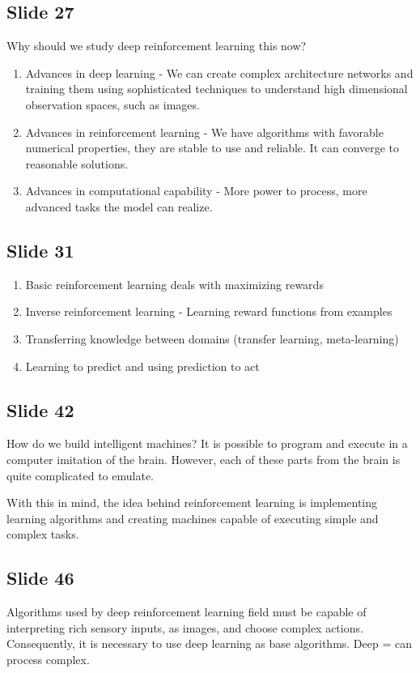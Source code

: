 \documentclass{article}
\begin{document}
\subsection*{Slide 27}
\par Why should we study deep reinforcement learning this now?
\begin{enumerate}
    \item  Advances in deep learning - We can create complex architecture networks and training them using
        sophisticated techniques to understand  high dimensional observation spaces, such as images.
    \item  Advances in reinforcement learning - We have algorithms with favorable numerical properties, they are
        stable to use and reliable. It can converge to reasonable solutions.
    \item Advances in computational capability - More power to process, more advanced tasks the model can realize.
\end{enumerate}

\subsection*{Slide 31}%
\label{sub:Slide 31}

\par 
\begin{enumerate}
    \item Basic reinforcement learning deals with maximizing rewards
    \item Inverse reinforcement learning - Learning reward functions from examples
    \item Transferring knowledge between domains (transfer learning, meta-learning)
    \item Learning to predict and using prediction to act
\end{enumerate}

\subsection*{Slide 42}%
\label{sub:Slide 42}
\par How do we build intelligent machines? It is possible to program and execute in a computer imitation of the brain.  However, each of these parts from the brain is quite complicated to emulate.

\par With this in mind, the idea behind reinforcement learning is implementing learning algorithms and creating machines 
capable of executing simple and complex tasks.


\subsection*{Slide 46}%
\label{sub:Slide 46}
\par 
Algorithms used by deep reinforcement learning field must be capable of interpreting rich sensory inputs, as images,
and choose complex actions. Consequently, it is necessary to use deep learning as base algorithms. Deep = can process
complex.
\end{document}
